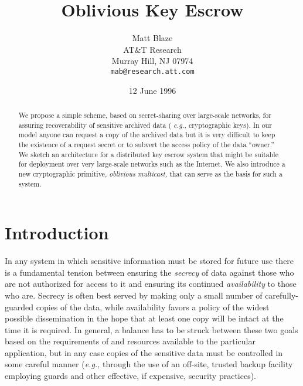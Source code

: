 


\title{Oblivious Key Escrow}

\author{{Matt Blaze}\\
AT\&T Research\\
Murray Hill, NJ 07974\\
{\tt mab@research.att.com}}

\date{12 June 1996}

\maketitle

\begin{abstract}
We propose a simple scheme, based on secret-sharing over large-scale
networks, for assuring recoverability of sensitive archived data ({\em
e.g.,} cryptographic keys).  In our model anyone can request a copy of
the archived data but it is very difficult to keep the existence of a
request secret or to subvert the access policy of the data ``owner.''
We sketch an architecture for a distributed key escrow system that
might be suitable for deployment over very large-scale networks such
as the Internet.  We also introduce a new cryptographic primitive,
{\em oblivious multicast,} that can serve as the basis for such a
system.
\end{abstract}

\section{Introduction}

In any system in which sensitive information must be stored for future
use there is a fundamental tension between ensuring the {\em secrecy}
of data against those who are not authorized for access to it and
ensuring its continued {\em availability} to those who are.  Secrecy
is often best served by making only a small number of
carefully-guarded copies of the data, while availability favors a
policy of the widest possible dissemination in the hope that at least
one copy will be intact at the time it is required.  In general, a
balance has to be struck between these two goals based on the
requirements of and resources available to the particular application,
but in any case copies of the sensitive data must be controlled in
some careful manner ({\em e.g.,} through the use of an off-site,
trusted backup facility employing guards and other effective, if
expensive, security practices).

